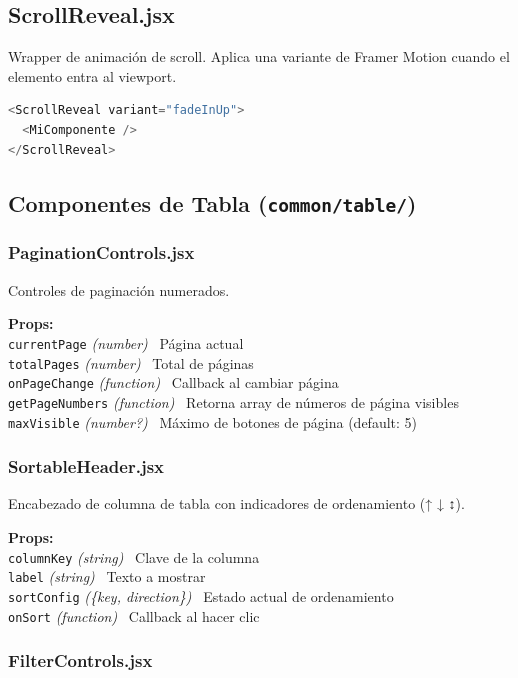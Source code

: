 \documentclass[12pt,a4paper]{article}
\newcommand{\prop}[3]{%
  \texttt{#1} \textit{(#2)} \textemdash\ #3\\%
}
\begin{document}
\subsection{ScrollReveal.jsx}

Wrapper de animación de scroll. Aplica una variante de Framer Motion cuando el elemento entra al viewport.

\begin{lstlisting}[language=JavaScript]
<ScrollReveal variant="fadeInUp">
  <MiComponente />
</ScrollReveal>
\end{lstlisting}

\subsection{Componentes de Tabla (\texttt{common/table/})}

\subsubsection{PaginationControls.jsx}

Controles de paginación numerados.

\begin{mdframed}[style=propbox]
\textbf{Props:}\\
\prop{currentPage}{number}{Página actual}
\prop{totalPages}{number}{Total de páginas}
\prop{onPageChange}{function}{Callback al cambiar página}
\prop{getPageNumbers}{function}{Retorna array de números de página visibles}
\prop{maxVisible}{number?}{Máximo de botones de página (default: 5)}
\end{mdframed}

\subsubsection{SortableHeader.jsx}

Encabezado de columna de tabla con indicadores de ordenamiento (↑ ↓ ↕).

\begin{mdframed}[style=propbox]
\textbf{Props:}\\
\prop{columnKey}{string}{Clave de la columna}
\prop{label}{string}{Texto a mostrar}
\prop{sortConfig}{\{key, direction\}}{Estado actual de ordenamiento}
\prop{onSort}{function}{Callback al hacer clic}
\end{mdframed}

\subsubsection{FilterControls.jsx}
\end{document}
